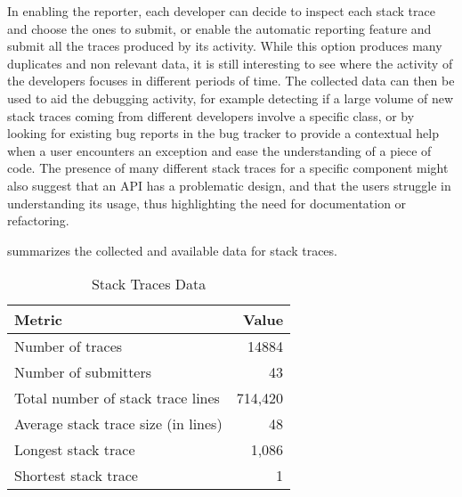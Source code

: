 In enabling the reporter, each developer can decide to inspect each stack trace and choose the ones to submit, or enable the automatic reporting feature and submit all the traces produced by its activity.
While this option produces many duplicates and non relevant data, it is still interesting to see where the activity of the developers focuses in different periods of time.
The collected data can then be used to aid the debugging activity, for example detecting if a large volume of new stack traces coming from different developers involve a specific class, or by looking for existing bug reports in the bug tracker to provide a contextual help when a user encounters an exception and ease the understanding of a piece of code.
The presence of many different stack traces for a specific component might also suggest that an API has a problematic design, and that the users struggle in understanding its usage, thus highlighting the need for documentation or refactoring.

 summarizes the collected and available data for stack traces.

\begin{table}[ht]
\centering
\caption{Stack Traces Data}
\label{tab:stacktraces}
\begin{tabular}{lr}

  \rowcolor{tableheader} \textbf{Metric} & \textbf{Value} \\ \hline Number of traces & 14884 \\
  Number of submitters & 43 \\
  Total number of stack trace lines & 714,420 \\
  Average stack trace size (in lines) & 48 \\
  Longest stack trace & 1,086 \\
  Shortest stack trace & 1 \\
  \hline
\end{tabular}
\end{table}

%



